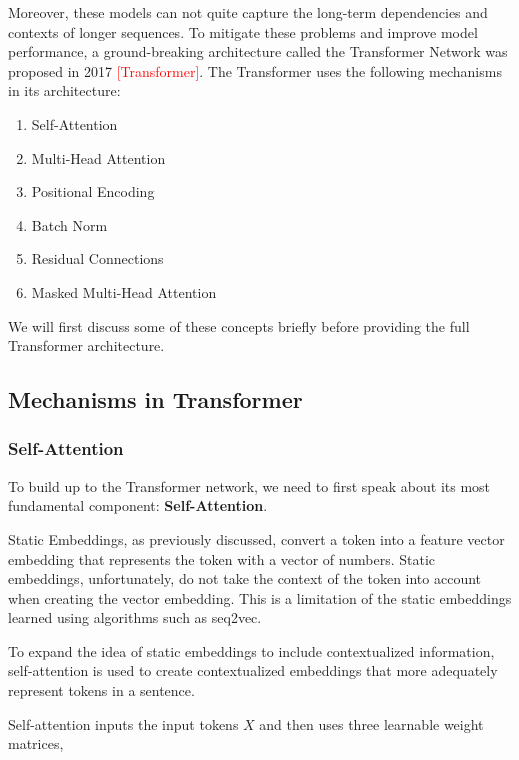 Moreover, these models can not quite capture the long-term dependencies and contexts of longer sequences. To mitigate these problems and improve model performance, a ground-breaking architecture called the Transformer Network was proposed in 2017 \textcolor{red}{[Transformer]}. The Transformer uses the following mechanisms in its architecture: \\[-20pt]
\begin{enumerate}
    \item Self-Attention \\[-20pt]
    \item Multi-Head Attention \\[-20pt]
    \item Positional Encoding \\[-20pt]
    \item Batch Norm \\[-20pt]
    \item Residual Connections \\[-20pt]
    \item Masked Multi-Head Attention \\[-20pt]
\end{enumerate}

We will first discuss some of these concepts briefly before providing the full Transformer architecture.

\subsection{Mechanisms in Transformer}
\subsubsection{Self-Attention}
To build up to the Transformer network, we need to first speak about its most fundamental component: \textbf{Self-Attention}.

Static Embeddings, as previously discussed, convert a token into a feature vector embedding that represents the token with a vector of numbers. Static embeddings, unfortunately, do not take the context of the token into account when creating the vector embedding. This is a limitation of the static embeddings learned using algorithms such as seq2vec.

To expand the idea of static embeddings to include contextualized information, self-attention is used to create contextualized embeddings that more adequately represent tokens in a sentence.

Self-attention inputs the input tokens ${X}$ and then uses three learnable weight matrices,

